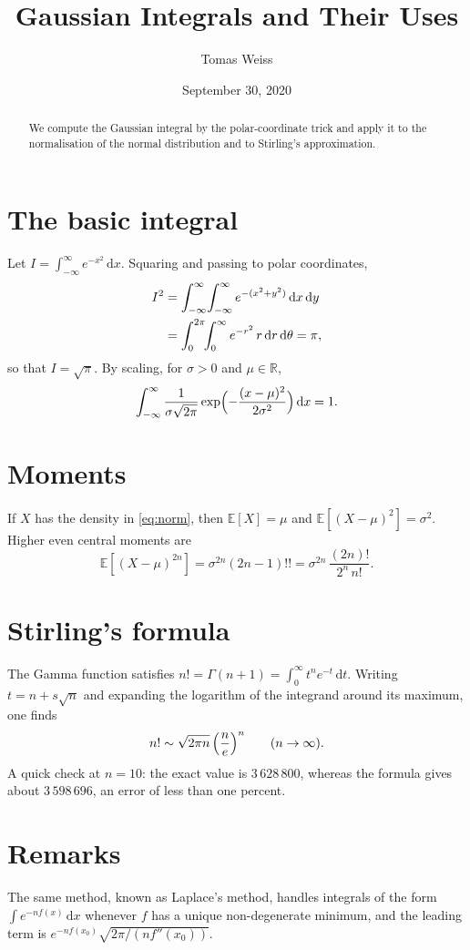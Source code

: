 \documentclass[12pt,letterpaper]{article}
\title{Gaussian Integrals and Their Uses}
\author{Tomas Weiss}
\date{September 30, 2020}
\newcommand{\dd}{\,\mathrm{d}}
\newcommand{\E}{\mathbb{E}}
\begin{document}
\maketitle

\begin{abstract}
We compute the Gaussian integral by the polar-coordinate trick and apply it to the normalisation of the normal distribution and to Stirling's approximation.
\end{abstract}

\section{The basic integral}
Let $I=\int_{-\infty}^{\infty}e^{-x^2}\dd x$. Squaring and passing to polar coordinates,
\begin{align}
  I^2 &= \int_{-\infty}^{\infty}\!\int_{-\infty}^{\infty} e^{-(x^2+y^2)}\dd x\dd y \notag\\
      &= \int_0^{2\pi}\!\!\int_0^\infty e^{-r^2}\,r\dd r\dd\theta = \pi,
\end{align}
so that $I=\sqrt{\pi}$. By scaling, for $\sigma>0$ and $\mu\in\mathbb{R}$,
\begin{equation}\label{eq:norm}
  \int_{-\infty}^{\infty}\frac{1}{\sigma\sqrt{2\pi}}\exp\Bigl(-\frac{(x-\mu)^2}{2\sigma^2}\Bigr)\dd x=1 .
\end{equation}

\section{Moments}
If $X$ has the density in \eqref{eq:norm}, then $\E[X]=\mu$ and $\E[(X-\mu)^2]=\sigma^2$. Higher even central moments are
\[
  \E[(X-\mu)^{2n}] = \sigma^{2n}(2n-1)!! = \sigma^{2n}\,\frac{(2n)!}{2^n\,n!}.
\]

\section{Stirling's formula}
The Gamma function satisfies $n!=\Gamma(n+1)=\int_0^\infty t^n e^{-t}\dd t$. Writing $t=n+s\sqrt n$ and expanding the logarithm of the integrand around its maximum, one finds
\[
  n! \sim \sqrt{2\pi n}\,\Bigl(\frac{n}{e}\Bigr)^{n}\qquad (n\to\infty).
\]
A quick check at $n=10$: the exact value is $3\,628\,800$, whereas the formula gives about $3\,598\,696$, an error of less than one percent.

\section*{Remarks}
The same method, known as Laplace's method, handles integrals of the form $\int e^{-nf(x)}\dd x$ whenever $f$ has a unique non-degenerate minimum, and the leading term is $e^{-nf(x_0)}\sqrt{2\pi/(nf''(x_0))}$.
\end{document}
